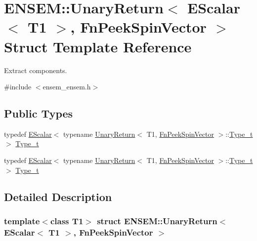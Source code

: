 \hypertarget{structENSEM_1_1UnaryReturn_3_01EScalar_3_01T1_01_4_00_01FnPeekSpinVector_01_4}{}\section{E\+N\+S\+EM\+:\+:Unary\+Return$<$ E\+Scalar$<$ T1 $>$, Fn\+Peek\+Spin\+Vector $>$ Struct Template Reference}
\label{structENSEM_1_1UnaryReturn_3_01EScalar_3_01T1_01_4_00_01FnPeekSpinVector_01_4}


Extract components.  




{\ttfamily \#include $<$ensem\+\_\+ensem.\+h$>$}

\subsection*{Public Types}
\begin{DoxyCompactItemize}
\item 
typedef \mbox{\hyperlink{classENSEM_1_1EScalar}{E\+Scalar}}$<$ typename \mbox{\hyperlink{structENSEM_1_1UnaryReturn}{Unary\+Return}}$<$ T1, \mbox{\hyperlink{structENSEM_1_1FnPeekSpinVector}{Fn\+Peek\+Spin\+Vector}} $>$\+::\mbox{\hyperlink{structENSEM_1_1UnaryReturn_3_01EScalar_3_01T1_01_4_00_01FnPeekSpinVector_01_4_ab36dc210813249d571d0447c7da504ac}{Type\+\_\+t}} $>$ \mbox{\hyperlink{structENSEM_1_1UnaryReturn_3_01EScalar_3_01T1_01_4_00_01FnPeekSpinVector_01_4_ab36dc210813249d571d0447c7da504ac}{Type\+\_\+t}}
\item 
typedef \mbox{\hyperlink{classENSEM_1_1EScalar}{E\+Scalar}}$<$ typename \mbox{\hyperlink{structENSEM_1_1UnaryReturn}{Unary\+Return}}$<$ T1, \mbox{\hyperlink{structENSEM_1_1FnPeekSpinVector}{Fn\+Peek\+Spin\+Vector}} $>$\+::\mbox{\hyperlink{structENSEM_1_1UnaryReturn_3_01EScalar_3_01T1_01_4_00_01FnPeekSpinVector_01_4_ab36dc210813249d571d0447c7da504ac}{Type\+\_\+t}} $>$ \mbox{\hyperlink{structENSEM_1_1UnaryReturn_3_01EScalar_3_01T1_01_4_00_01FnPeekSpinVector_01_4_ab36dc210813249d571d0447c7da504ac}{Type\+\_\+t}}
\end{DoxyCompactItemize}


\subsection{Detailed Description}
\subsubsection*{template$<$class T1$>$\newline
struct E\+N\+S\+E\+M\+::\+Unary\+Return$<$ E\+Scalar$<$ T1 $>$, Fn\+Peek\+Spin\+Vector $>$}

